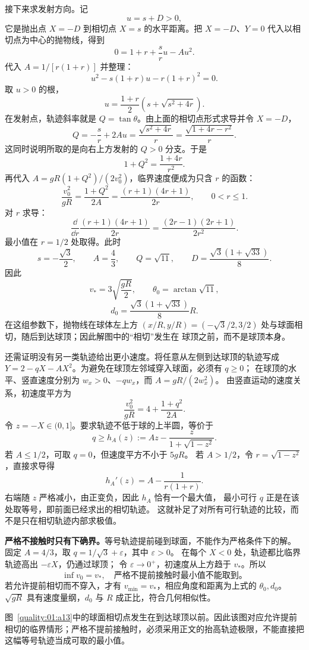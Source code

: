 {\begin{xesolution}
接下来求发射方向。记
\[
 u=s+D>0,
\]
它是抛出点 $X=-D$ 到相切点 $X=s$ 的水平距离。把 $X=-D$、$Y=0$ 代入以相切点为中心的抛物线，得到
\[
 0=1+r+\frac{s}{r}u-Au^2.
\]
代入 $A=1/[r(1+r)]$ 并整理：
\[
 u^2-s(1+r)u-r(1+r)^2=0.
\]
取 $u>0$ 的根，
\[
 u=\frac{1+r}{2}\left(s+\sqrt{s^2+4r}\right).
\]
在发射点，轨迹斜率就是 $Q=\tan\theta$。由上面的相切点形式求导并令 $X=-D$，
\[
 Q=-\frac{s}{r}+2Au
 =\frac{\sqrt{s^2+4r}}{r}
 =\frac{\sqrt{1+4r-r^2}}{r}.
\]
这同时说明所取的是向右上方发射的 $Q>0$ 分支。于是
\[
 1+Q^2=\frac{1+4r}{r^2}.
\]
再代入 $A=gR(1+Q^2)/(2v_0^2)$，临界速度便成为只含 $r$ 的函数：
\[
 \frac{v_0^2}{gR}=\frac{1+Q^2}{2A}
 =\frac{(r+1)(4r+1)}{2r},\qquad 0<r\le1.
\]
对 $r$ 求导：
\[
 \frac{\dd}{\dd r}\frac{(r+1)(4r+1)}{2r}
 =\frac{(2r-1)(2r+1)}{2r^2}.
\]
最小值在 $r=1/2$ 处取得。此时
\[
 s=-\frac{\sqrt3}{2},\qquad A=\frac43,\qquad
 Q=\sqrt{11},\qquad
 D=\frac{\sqrt3(1+\sqrt{33})}{8}.
\]
因此
\[
 \boxed{v_*=3\sqrt{\frac{gR}{2}}},\qquad
 \boxed{\theta_0=\arctan\sqrt{11}},
\]
\[
 \boxed{d_0=\frac{\sqrt3(1+\sqrt{33})}{8}R}.
\]
在这组参数下，抛物线在球体左上方
$(x/R,y/R)=(-\sqrt3/2,3/2)$ 处与球面相切，随后到达球顶；因此解图中的“相切”发生在
球顶之前，而不是球顶本身。

还需证明没有另一类轨迹给出更小速度。将任意从左侧到达球顶的轨迹写成
$Y=2-qX-AX^2$。为避免在球顶左邻域穿入球面，必须有 $q\ge0$；
在球顶的水平、竖直速度分别为 $w_x>0$、$-qw_x$，而 $A=gR/(2w_x^2)$。
由竖直运动的速度关系，初速度平方为
\[
 \frac{v_0^2}{gR}=4+\frac{1+q^2}{2A}.
\]
令 $z=-X\in(0,1]$。要求轨迹不低于球的上半圆，等价于
\[
 q\ge h_A(z):=Az-\frac{z}{1+\sqrt{1-z^2}}.
\]
若 $A\le1/2$，可取 $q=0$，但速度平方不小于 $5gR$。
若 $A>1/2$，令 $r=\sqrt{1-z^2}$，直接求导得
\[
 h_A'(z)=A-\frac1{r(1+r)}.
\]
右端随 $z$ 严格减小，由正变负，因此 $h_A$ 恰有一个最大值，
最小可行 $q$ 正是在该处取等号，即前面已经求出的相切轨迹。
这就补足了对所有可行轨迹的比较，而不是只在相切轨迹内部求极值。

\textbf{严格不接触时只有下确界。}等号轨迹提前碰到球面，不能作为严格条件下的解。
固定 $A=4/3$，取 $q=1/\sqrt3+\varepsilon$，其中 $\varepsilon>0$。
在每个 $X<0$ 处，轨迹都比临界轨迹高出 $-\varepsilon X$，仍通过球顶；
令 $\varepsilon\to0^+$，初速度从上方趋于 $v_*$。所以
\[
 \boxed{\inf v_0=v_*,\quad\text{严格不提前接触时最小值不能取到。}}
\]
若允许提前相切而不穿入，才有 $v_{\min}=v_*$，相应角度和距离为上式的 $\theta_0,d_0$。
$\sqrt{gR}$ 具有速度量纲，$d_0$ 与 $R$ 成正比，符合几何相似性。

图~\ref{quality:01:a13}中的球面相切点发生在到达球顶以前。因此该图对应允许提前相切的临界情形；严格不提前接触时，必须采用正文的抬高轨迹极限，不能直接把这幅等号轨迹当成可取的最小值。
\end{xesolution}

}

